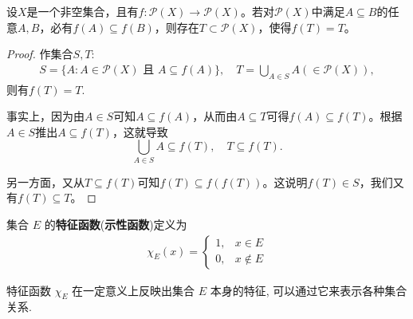 \documentclass[../../main.tex]{subfiles}%
\begin{document}
\begin{proposition}[单调映射的不动点]\label{proposition:单调映射的不动点}
设\(X\)是一个非空集合，且有\(f:\mathcal{P}(X)\to\mathcal{P}(X)\)。若对\(\mathcal{P}(X)\)中满足\(A\subseteq B\)的任意\(A,B\)，必有\(f(A)\subseteq f(B)\)，则存在\(T\subset\mathcal{P}(X)\)，使得\(f(T)=T\)。
\end{proposition}
\begin{proof}

作集合\(S,T\):
\begin{align*}
S=\{A:A\in\mathcal{P}(X)\text{ 且 }A\subseteq f(A)\},\quad T=\bigcup_{A\in S}A(\in\mathcal{P}(X)),
\end{align*}
则有\(f(T)=T\).

事实上，因为由\(A\in S\)可知\(A\subseteq f(A)\)，从而由\(A\subseteq T\)可得\(f(A)\subseteq f(T)\)。根据\(A\in S\)推出\(A\subseteq f(T)\)，这就导致
\[
\bigcup_{A\in S}A\subseteq f(T),\quad T\subseteq f(T).
\]

另一方面，又从\(T\subseteq f(T)\)可知\(f(T)\subseteq f(f(T))\)。这说明\(f(T)\in S\)，我们又有\(f(T)\subseteq T\)。

\end{proof}

\begin{definition}
集合 $E$ 的\textbf{特征函数}(\textbf{示性函数})定义为
\begin{align*}
\chi_E(x) = 
\begin{cases}
1, & x \in E\\
0, & x \notin E
\end{cases}
\end{align*}
\end{definition}
\begin{note}
特征函数 $\chi_E$ 在一定意义上反映出集合 $E$ 本身的特征, 可以通过它来表示各种集合关系.
\end{note}
\end{document}
